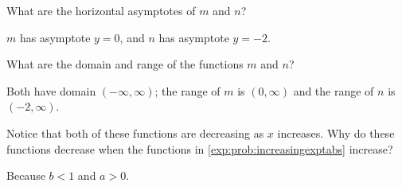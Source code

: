 \begin{exercises}
\begin{problem}
\begin{subproblem}
\begin{shortsolution}
	\end{shortsolution}
\end{subproblem}
\begin{subproblem}
	What are the horizontal asymptotes of $m$ and $n$?
	\begin{shortsolution}
		$m$ has asymptote $y=0$, and $n$ has asymptote $y=-2$.
	\end{shortsolution}
\end{subproblem}
\begin{subproblem}
	What are the domain and range of the functions $m$ and $n$?
	\begin{shortsolution}
		Both have domain $(-\infty,\infty)$; the range of $m$ is $(0,\infty)$ and the range of $n$ is $(-2,\infty)$.
	\end{shortsolution}
\end{subproblem}
\begin{subproblem}
	Notice that both of these functions are decreasing as $x$ increases.  Why do these functions decrease when 
	the functions in \cref{exp:prob:increasingexptabs} increase?
	\begin{shortsolution}
		Because $b<1$ and $a>0$.
	\end{shortsolution}
\end{subproblem}
\end{problem}


\end{exercises}
